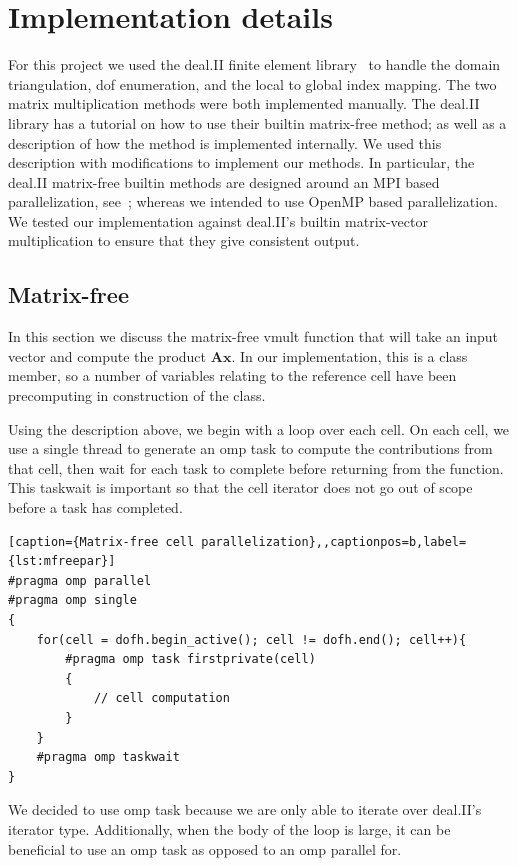 \documentclass[12pt]{article}
\newcommand{\vect}[1]{\boldsymbol{\mathbf{#1}}}
\begin{document}
\section{Implementation details}\label{sec:impl}

For this project we used the deal.II finite element library~\cite{dealII91} to handle the domain triangulation, dof enumeration, and the local to global index mapping. The two matrix multiplication methods were both implemented manually. The deal.II library has a tutorial on how to use their builtin matrix-free method; as well as a description of how the method is implemented internally. We used this description with modifications to implement our methods. In particular, the deal.II matrix-free builtin methods are designed around an MPI based parallelization, see~\cite{step37}; whereas we intended to use OpenMP based parallelization. We tested our implementation against deal.II's builtin matrix-vector multiplication to ensure that they give consistent output.

\subsection{Matrix-free}
In this section we discuss the matrix-free vmult function that will take an input vector and compute the product $\vect A\vect x$. In our implementation, this is a class member, so a number of variables relating to the reference cell have been precomputing in construction of the class.

Using the description above, we begin with a loop over each cell. On each cell, we use a single thread to generate an omp task to compute the contributions from that cell, then wait for each task to complete before returning from the function. This taskwait is important so that the cell iterator does not go out of scope before a task has completed. 
\begin{lstlisting}[caption={Matrix-free cell parallelization},,captionpos=b,label={lst:mfreepar}]
#pragma omp parallel
#pragma omp single
{
  	for(cell = dofh.begin_active(); cell != dofh.end(); cell++){
		#pragma omp task firstprivate(cell)
		{
			// cell computation
		}
	}
	#pragma omp taskwait
}            
\end{lstlisting}

We decided to use omp task because we are only able to iterate over deal.II's iterator type. Additionally, when the body of the loop is large, it can be beneficial to use an omp task as opposed to an omp parallel for. 
\end{document}
